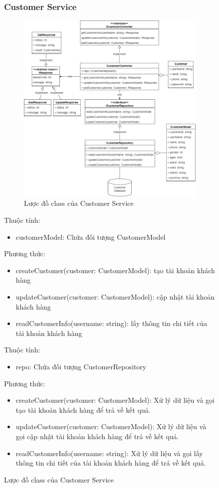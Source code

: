 \begin{figure}[!htp]
\subsubsection{Customer Service}
\begin{figure}[!htp]
	\centering
	\includegraphics[width=11cm]{img/Architecture/service/CustomerService.png}
	\newline
	\caption{Lược đồ class của Customer Service}
\end{figure}

	Thuộc tính:
	\begin{itemize}
		\item customerModel: Chứa đối tượng CustomerModel
	\end{itemize}
	Phương thức:
	\begin{itemize}
		\item createCustomer(customer: CustomerModel): tạo tài khoản khách hàng
		\item updateCustomer(customer: CustomerModel): cập nhật tài khoản khách hàng
		\item readCustomerInfo(username: string): lấy thông tin chi tiết của tài khoản khách hàng
	\end{itemize}

	Thuộc tính:
	\begin{itemize}
		\item repo: Chứa đối tượng CustomerRepository
	\end{itemize}
	Phương thức:
	\begin{itemize}
		\item createCustomer(customer: CustomerModel): Xử lý dữ liệu và gọi tạo tài khoản khách hàng để trả về kết quả.
		\item updateCustomer(customer: CustomerModel): Xử lý dữ liệu và gọi cập nhật tài khoản khách hàng để trả về kết quả.
		\item readCustomerInfo(username: string): Xử lý dữ liệu và gọi lấy thông tin chi tiết của tài khoản khách hàng để trả về kết quả.
	\end{itemize}


\end{figure}
